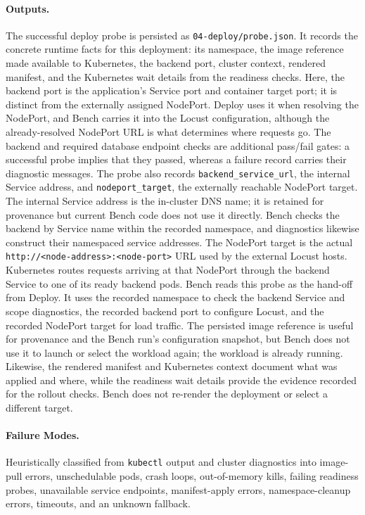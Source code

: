 \paragraph{Outputs.}
The successful deploy probe is persisted as \texttt{04-deploy/probe.json}.
It records the concrete runtime facts for this deployment: its namespace,
the image reference made available to Kubernetes, the backend port, cluster
context, rendered manifest, and the Kubernetes wait details from the
readiness checks. Here, the backend port is the application's Service port
and container target port; it is distinct from the externally assigned
NodePort. Deploy uses it when resolving the NodePort, and Bench carries it
into the Locust configuration, although the already-resolved NodePort URL is
what determines where requests go. The backend and required database
endpoint checks are additional pass/fail gates: a successful probe implies
that they passed, whereas a failure record carries their diagnostic
messages. The probe also records \texttt{backend\_service\_url}, the
internal Service address, and \texttt{nodeport\_target}, the externally
reachable NodePort target. The internal Service address is the in-cluster
DNS name; it is retained for provenance but current Bench code does not use
it directly. Bench checks the backend by Service name within the recorded
namespace, and diagnostics likewise construct their namespaced service
addresses. The NodePort target is the actual
\texttt{http://<node-address>:<node-port>} URL used by the external Locust
hosts. Kubernetes routes requests arriving at that NodePort through the
backend Service to one of its ready backend pods. Bench reads this probe as
the hand-off from Deploy. It uses the recorded namespace to check the
backend Service and scope diagnostics, the recorded backend port to configure
Locust, and the recorded NodePort target for load traffic. The persisted
image reference is useful for provenance and the Bench run's configuration
snapshot, but Bench does not use it to launch or select the workload again;
the workload is already running. Likewise, the rendered manifest and
Kubernetes context document what was applied and where, while the readiness
wait details provide the evidence recorded for the rollout checks. Bench does
not re-render the deployment or select a different target.

\paragraph{Failure Modes.}
Heuristically classified from \texttt{kubectl} output and cluster
diagnostics into image-pull errors, unschedulable pods, crash loops,
out-of-memory kills, failing readiness probes, unavailable service
endpoints, manifest-apply errors, namespace-cleanup errors, timeouts, and an
unknown fallback.

